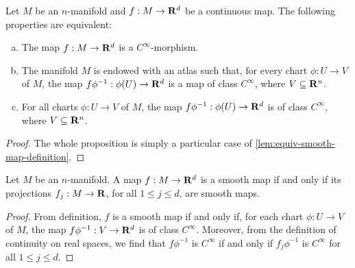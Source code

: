 \begin{corollary}
    \label{cor:equiv-smooth-vec-val-map}
    Let \(M\) be an \(n\)-manifold and \(f: M \to \mathbf{R}^d\) be a continuous map. The
    following properties are equivalent:
    \begin{enumerate}[(a)]\setlength\itemsep{0em}
        \item The map \(f: M \to \mathbf{R}^d\) is a \(C^{\infty}\)-morphism.

        \item The manifold \(M\) is endowed with an atlas such that, for every chart
              \(\phi: U \to V\) of \(M\), the map \(f \phi^{-1}: \phi(U) \to \mathbf{R}^d\) is a map
              of class \(C^{\infty}\), where \(V \subseteq \mathbf{R}^n\).

        \item For all charts \(\phi: U \to V\) of \(M\), the map \(f \phi^{-1}: \phi(U)
              \to \mathbf{R}^d\) is of class \(C^{\infty}\), where \(V \subseteq \mathbf{R}^n\).
    \end{enumerate}
\end{corollary}

\begin{proof}
    The whole proposition is simply a particular case of
    \cref{lem:equiv-smooth-map-definition}.
\end{proof}

\begin{proposition}
    \label{prop:smoothness-from-components}
    Let \(M\) be an \(n\)-manifold. A map \(f: M \to \mathbf{R}^d\) is a smooth map if and
    only if its projections \(f_j: M \to \mathbf{R}\), for all \(1 \leq j \leq d\), are
    smooth maps.
\end{proposition}

\begin{proof}
    From definition, \(f\) is a smooth map if and only if, for each chart \(\phi: U
    \to V\) of \(M\), the map \(f \phi^{-1}: V \to \mathbf{R}^d\) is of class
    \(C^{\infty}\). Moreover, from the definition of continuity on real spaces, we
    find that \(f \phi^{-1}\) is \(C^{\infty}\) if and only if \(f_j \phi^{-1}\) is
    \(C^{\infty}\) for all \(1 \leq j \leq d\).
\end{proof}

